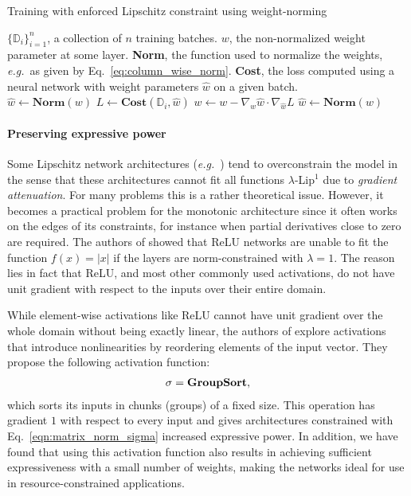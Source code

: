 \documentclass{article}
\begin{document}
\begin{algorithm}
\caption{Training with enforced Lipschitz constraint using weight-norming}\label{alg:lipnn}
\begin{algorithmic}
\Require $\{\mathbb{D}_i\}_{i=1}^n$, a collection of $n$ training batches.
\Require $w$, the non-normalized weight parameter at some layer.
\Require \textbf{{Norm}}, the function used to normalize the weights, {\em e.g.}\ as given by Eq.~\eqref{eq:column_wise_norm}.
\Require \textbf{{Cost}}, the loss computed using a neural network with weight parameters $\hat w$ on a given batch.\\
\State $\hat{w} \gets \mathrm{\textbf{Norm}}(w) $
\State $L \gets \mathrm{\textbf{Cost}}(\mathbb{D}_i, \hat{w})$
\State $w \gets w - \nabla_w \hat{w} \cdot \nabla_{\hat{w}} L$
\State $\hat{w} \gets  \mathrm{\textbf{Norm}}(w)$
\EndFor
\EndWhile
{}
\end{algorithmic}
\end{algorithm}

\paragraph{Preserving expressive power}
Some Lipschitz network architectures ({\em e.g.}\ \cite{spectral2018}) tend to overconstrain the model in the sense that these architectures
cannot fit all functions $\lambda$-Lip$^1$ due to {\em gradient attenuation}.
For many problems this is a rather theoretical issue.
However, it becomes a practical problem for the monotonic architecture since
it often works on the edges of its constraints, for instance when
partial derivatives close to zero are required.
The authors of \cite{huster2018} showed that ReLU networks are unable to fit the
function $f(x) = |x|$ if the layers are norm-constrained with $\lambda = 1$.
The reason lies in fact that ReLU, and most other commonly used
activations, do not have unit gradient with respect to the inputs over their entire domain.

While element-wise activations like ReLU cannot have unit gradient over the whole domain without being exactly linear, the authors of \cite{sorting2019} explore
activations that introduce nonlinearities by reordering elements of the input vector. 
They propose the following activation function: 
\begin{align}
\sigma = {\rm \textbf{GroupSort}}, 
\end{align}
which sorts its inputs in chunks (groups) of a fixed size.
This operation has gradient $1$ with respect to every input
and gives architectures constrained
with Eq.~\eqref{eqn:matrix_norm_sigma} increased expressive power. 
In addition, we have found that using this activation function also results in achieving sufficient expressiveness with a small number of weights, making the networks ideal for use in resource-constrained applications. 
\end{document}
